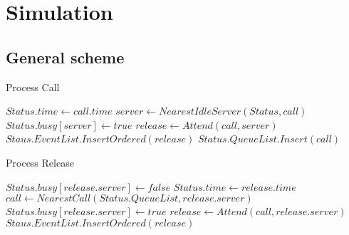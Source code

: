 \section{Simulation}
\subsection{General scheme}
\frame{}
\frame{}

\begin{frame}
  \begin{algorithm}
    \hline \vspace{3pt}
    \caption{Process Call}\label{proc_call}
    \vspace{3pt} \hline
    \begin{algorithmic}[0]
      \State $Status.time \gets call.time$
      \State $server \gets NearestIdleServer(Status,call)$
      \State $Status.busy[server] \gets true$
      \State $release \gets Attend(call,server)$
      \State $Staus.EventList.InsertOrdered(release)$
      \Else
      \State $Status.QueueList.Insert(call)$
      \EndIf
      \EndProcedure
      \hline
    \end{algorithmic}
  \end{algorithm}
\end{frame}

\begin{frame}
  \begin{algorithm}
    \hline \vspace{3pt}
    \caption{Process Release}\label{proc_rel}
    \vspace{3pt} \hline
    \begin{algorithmic}[0]
      \State $Status.busy[release.server] \gets false$
      \State $Status.time \gets release.time$
      \State $call \gets NearestCall(Status.QueueList,release.server)$
      \State $Status.busy[release.server] \gets true$
      \State $release \gets Attend(call,release.server)$
      \State $Staus.EventList.InsertOrdered(release)$
      \EndIf
      \EndProcedure
      \hline
    \end{algorithmic}
  \end{algorithm}
\end{frame}

